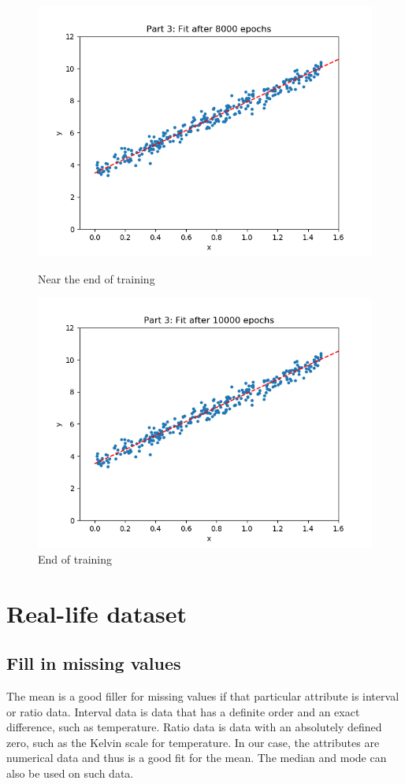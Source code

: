 \documentclass[paper=a4, fontsize=11pt]{scrartcl} %
\numberwithin{equation}{section} %
\numberwithin{figure}{section} %
\numberwithin{table}{section} %
\begin{document}
\begin{figure}[H]
    \includegraphics[width=\linewidth]{q2p35.png}
    \caption{Near the end of training}
    \label{fig:q2p35}
    \includegraphics[width=\linewidth]{q2p36.png}
    \caption{End of training}
    \label{fig:q2p36}
\end{figure}

\section{Real-life dataset}
\subsection{Fill in missing values}
The mean is a good filler for missing values if that particular attribute is interval or ratio data. Interval data is data that has a definite order and an exact difference, such as temperature. Ratio data is data with an absolutely defined zero, such as the Kelvin scale for temperature. In our case, the attributes are numerical data and thus is a good fit for the mean. The median and mode can also be used on such data. \\
\end{document}
